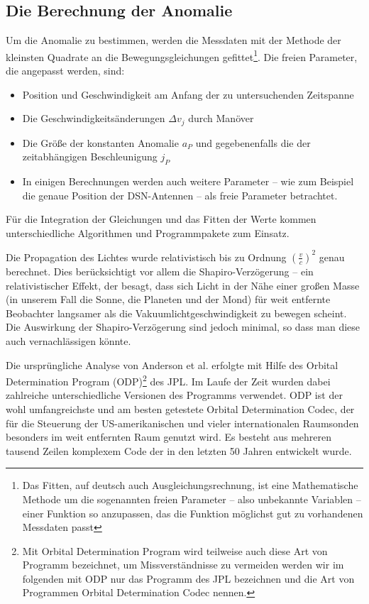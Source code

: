 \subsection{Die Berechnung der Anomalie}
Um die Anomalie zu bestimmen, werden die Messdaten mit der Methode der kleinsten Quadrate an die Bewegungsgleichungen gefittet\footnote{Das Fitten, auf deutsch auch Ausgleichungsrechnung, ist eine Mathematische Methode um die sogenannten freien Parameter – also unbekannte Variablen – einer Funktion so anzupassen, das die Funktion möglichst gut zu vorhandenen Messdaten passt}. Die freien Parameter, die angepasst werden, sind:
\begin{itemize}
\item Position und Geschwindigkeit am Anfang der zu untersuchenden Zeitspanne
\item Die Geschwindigkeitsänderungen $\Delta v_j$ durch Manöver
\item Die Größe der konstanten Anomalie $a_P$ und gegebenenfalls die der zeitabhängigen Beschleunigung $j_P$
\item In einigen Berechnungen werden auch weitere Parameter – wie zum Beispiel die genaue Position der DSN-Antennen – als freie Parameter betrachtet.
\end{itemize}
Für die Integration der Gleichungen und das Fitten der Werte kommen unterschiedliche Algorithmen und Programmpakete zum Einsatz.

Die Propagation des Lichtes wurde relativistisch bis zu Ordnung $(\frac{v}{c})^2$ genau berechnet.
Dies berücksichtigt vor allem die Shapiro-Verzögerung – ein relativistischer Effekt, der besagt,
dass sich Licht in der Nähe einer großen Masse (in unserem Fall die Sonne, die Planeten und der Mond) für weit entfernte Beobachter langsamer als die Vakuumlichtgeschwindigkeit zu bewegen scheint. %
Die Auswirkung der Shapiro-Verzögerung sind jedoch minimal,\cite{Levy2008} so dass man diese auch vernachlässigen könnte.

Die ursprüngliche Analyse von Anderson et al. erfolgte mit Hilfe des Orbital Determination Program (ODP)\footnote{Mit Orbital Determination Program wird teilweise auch diese Art von Programm bezeichnet, um Missverständnisse zu vermeiden werden wir im folgenden mit ODP nur das Programm des JPL bezeichnen und die Art von Programmen Orbital Determination Codec nennen.} des JPL. Im Laufe der Zeit wurden dabei zahlreiche unterschiedliche Versionen des Programms verwendet. ODP ist der wohl umfangreichste und am besten getestete Orbital Determination Codec, der für die Steuerung der US-amerikanischen und vieler internationalen Raumsonden besonders im weit entfernten Raum genutzt wird. Es besteht aus mehreren tausend Zeilen komplexem Code der in den letzten 50 Jahren entwickelt wurde.\cite{Turyshev2010}

